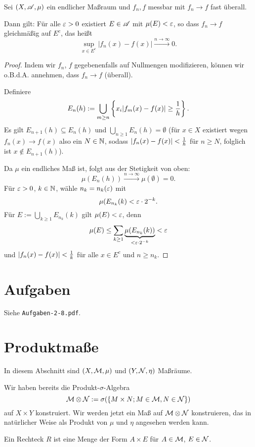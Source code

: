 \begin{thm}[Jegorow]
 Sei $(X, \mathscr{A}, \mu)$ ein endlicher Maßraum und $f_n, f$ messbar mit $f_n \to f$ fast überall.
 
 Dann gilt: Für alle $\varepsilon > 0$ existiert $E \in \mathscr{A}$ mit $\mu(E) < \varepsilon$, so dass $f_n \to f$ gleichmäßig auf $E^c$, das heißt
 \[ \sup_{x \in E^c} | f_n(x) - f(x) | \xrightarrow{n \to \infty} 0. \]
\end{thm}

\begin{proof}
 Indem wir $f_n$, $f$ gegebenenfalls auf Nullmengen modifizieren, können wir o.B.d.A. annehmen, dass $f_n \to f$ (überall).
 
 Definiere 
 \[ E_n(h) := \bigcup_{m \ge n} \left\{x_i | f_m(x) -f(x) | \ge \frac{1}{h} \right\}. \]
 Es gilt $E_{n+1}(h) \subseteq E_n(h)$ und $\bigcup_{n \ge 1} E_n(h) = \emptyset$ (für $x \in X$ existiert wegen $f_n(x) \to f(x)$ also ein $N \in \mathbb{N}$, sodass $| f_n(x) - f(x) | < \frac{1}{h}$ für $n \ge N$, folglich ist $x \notin E_{n+1}(h)$).
 
 Da $\mu$ ein endliches Maß ist, folgt aus der Stetigkeit von oben:
 \[ \mu( E_n(h) ) \xrightarrow{n \to \infty} \mu(\emptyset) = 0. \]
 Für $\varepsilon > 0$, $k \in \mathbb{N}$, wähle $n_k = n_k(\varepsilon)$ mit
 \[ \mu( E_{n_k}(k) < \varepsilon \cdot 2^{-k}. \]
 Für $E := \bigcup_{k \ge 1} E_{n_k}(k)$ gilt $\mu(E) < \varepsilon$, denn
 \[ \mu(E) \le \sum_{k\ge 1} \underbrace{\mu( E_{n_k}(k) )}_{< \varepsilon \cdot 2^{-k}} < \varepsilon \]
 und $| f_n(x) - f(x) | < \frac{1}{k}$ für alle $x \in E^c$ und $n \ge n_k$.
\end{proof}

\section{Aufgaben}
Siehe \verb+Aufgaben-2-8.pdf+.

\section{Produktmaße}
In diesem Abschnitt sind $(X, \mathcal{M}, \mu)$ und $(Y, \mathcal{N}, \eta)$ Maßräume.

Wir haben bereits die Produkt-$\sigma$-Algebra
\[ \mathcal{M} \otimes \mathcal{N} := \sigma( \{ M \times N; M \in \mathcal{M}, N \in \mathcal{N} \} ) \]
auf $X \times Y$ konstruiert. Wir werden jetzt ein Maß auf $\mathcal{M} \otimes \mathcal{N}$ konstruieren, das in natürlicher Weise als Produkt von $\mu$ und $\eta$ angesehen werden kann.

Ein Rechteck $R$ ist eine Menge der Form $A \times E$ für $A \in \mathcal{M}$, $E \in \mathcal{N}$.

